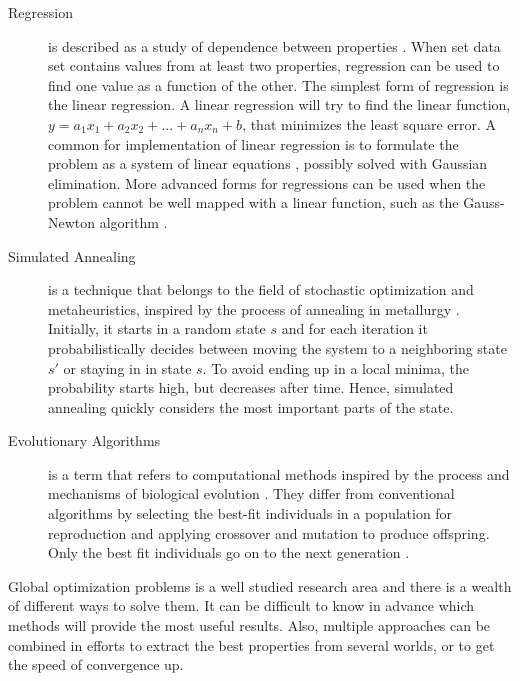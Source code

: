 \begin{description}

    \item[Regression] is described as a study of dependence between properties
        \cite{weisberg2005applied}. When set data set contains values from at least two
        properties, regression can be used to find one value as a function of the
        other. The simplest form of regression is the linear regression. A linear
        regression will try to find the linear function,
        $y=a_1x_1+a_2x_2+...+a_nx_n+b$, that minimizes the least square error. A common
        for implementation of linear regression is to formulate the problem as a system
        of linear equations \cite{lay2011linear}, possibly solved with Gaussian
        elimination. More advanced forms for regressions can be used when the problem
        cannot be well mapped with a linear function, such as the Gauss-Newton
        algorithm \cite{myers1990classical}.

    \item[Simulated Annealing] is a technique that belongs to the field of
        stochastic optimization and metaheuristics, inspired by the process of
        annealing in metallurgy \cite{van1987simulated}. Initially, it starts in a
        random state $s$ and for each iteration it probabilistically decides between
        moving the system to a neighboring state $s'$ or staying in in state $s$. To
        avoid ending up in a local minima, the probability starts high, but decreases
        after time. Hence, simulated annealing quickly considers the most important
        parts of the state.

    \item[Evolutionary Algorithms] is a term that refers to computational
        methods inspired by the process and mechanisms of biological evolution \cite{fogel1997evolutionary}.
        They differ from conventional algorithms by selecting the best-fit
        individuals in a population for reproduction and applying crossover and
        mutation to produce offspring. Only the best fit individuals go on to the next
        generation \cite{introtoga}.

\end{description}

Global optimization problems is a well studied research area and there is a
wealth of different ways to solve them. It can be difficult to know in advance
which methods will provide the most useful results. Also, multiple approaches
can be combined in efforts to extract the best properties from several worlds,
or to get the speed of convergence up.

